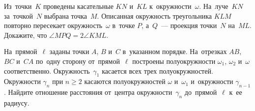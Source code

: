 \begin{problems}
\item
Из~точки~$K$ проведены касательные $KN$ и~$KL$ к~окружности~$\omega$.
На~луче~$KN$ за~точкой~$N$ выбрана точка~$M$.
Описанная окружность треугольника $KLM$ повторно пересекает окружность~$\omega$
в~точке $P$, а~$Q$~--- проекция точки~$N$ на~$ML$.
Докажите, что $\angle MPQ = 2 \angle KML$.

\item
На~прямой~$\ell$ заданы точки $A$, $B$ и~$C$ в~указанном порядке.
На~отрезках $AB$, $BC$ и~$CA$ по~одну сторону от~прямой~$\ell$ построены
полуокружности $\omega_{1}$, $\omega_{2}$ и~$\omega$ соответственно.
Окружность~$\gamma_{1}$ касается всех трех полуокружностей.
Окружности $\gamma_{n}$ при $n \geq 2$ касаются
полуокружностей $\omega$ и~$\omega_{1}$ и~окружности $\gamma_{n-1}$.
Найдите отношение расстояния от~центра окружности~$\gamma_{n}$ до~прямой~$\ell$
к~ее радиусу.

\end{problems}

